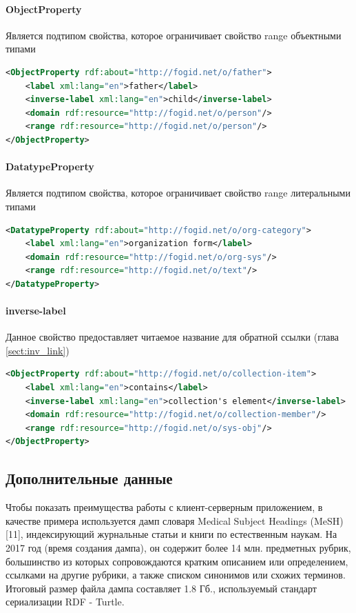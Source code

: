 \documentclass[12pt]{article}
\begin{document}
\paragraph{ObjectProperty} Является подтипом свойства, которое ограничивает свойство range объектными типами
\begin{lstlisting}[language=XML]
<ObjectProperty rdf:about="http://fogid.net/o/father">
    <label xml:lang="en">father</label>
    <inverse-label xml:lang="en">child</inverse-label>
    <domain rdf:resource="http://fogid.net/o/person"/>
    <range rdf:resource="http://fogid.net/o/person"/>
</ObjectProperty>
\end{lstlisting}

\paragraph{DatatypeProperty} Является подтипом свойства, которое ограничивает свойство range литеральными типами
\begin{lstlisting}[language=XML]
<DatatypeProperty rdf:about="http://fogid.net/o/org-category">
    <label xml:lang="en">organization form</label>
    <domain rdf:resource="http://fogid.net/o/org-sys"/>
    <range rdf:resource="http://fogid.net/o/text"/>
</DatatypeProperty>
\end{lstlisting}

\paragraph{inverse-label} Данное свойство предоставляет читаемое название для обратной ссылки (глава \ref{sect:inv_link})
\begin{lstlisting}[language=XML]
<ObjectProperty rdf:about="http://fogid.net/o/collection-item">
    <label xml:lang="en">contains</label>
    <inverse-label xml:lang="en">collection's element</inverse-label>
    <domain rdf:resource="http://fogid.net/o/collection-member"/>
    <range rdf:resource="http://fogid.net/o/sys-obj"/>
</ObjectProperty>
\end{lstlisting}

\subsection{Дополнительные данные}
Чтобы показать преимущества работы с клиент-серверным приложением, в качестве примера используется дамп словаря Medical Subject Headings (MeSH)[11], индексирующий журнальные статьи и книги по естественным наукам. На 2017 год (время создания дампа), он содержит более 14 млн. предметных рубрик, большинство из которых сопровождаются кратким описанием или определением, ссылками на другие рубрики, а также списком синонимов или схожих терминов. Итоговый размер файла дампа составляет 1.8 Гб., используемый стандарт сериализации RDF - Turtle.
\end{document}
